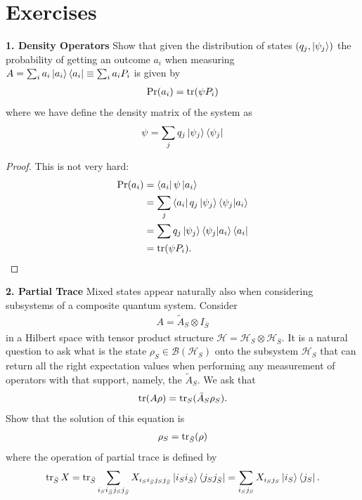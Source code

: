 \documentclass{book}
\theoremstyle{definition}
\newcommand{\nn}{\nonumber}
\newcommand{\had}{\mathcal{H}}
\begin{document}
\newpage


\section{Exercises}

\noindent \textbf{1. Density Operators} Show that given the distribution of states $(q_j, \ket{\psi_j})$ the probability of getting an outcome $a_i$ when measuring $A = \sum_i a_i \ket{a_i}\bra{a_i} \equiv \sum_i a_i P_i$ is given by
\begin{align}
\Pr(a_i) = \tr(\psi P_i)
\end{align} 
where we have define the density matrix of the system as
\begin{align}
\psi = \sum_j q_j \ket{\psi_j}\bra{\psi_j}
\end{align}


\begin{proof}
	This is not very hard: 
	\begin{align}
	\Pr(a_i) &= \bra{a_i} \psi \ket{a_i}\nn\\
	&= \sum_j \bra{a_i} q_j \ket{\psi_j}\bra{\psi_j}\ket{a_i}\nn\\
	&= \sum q_j \ket{\psi_j}\bra{\psi_j}\ket{a_i}\bra{a_i}\nn\\
	&= \tr(\psi P_i).
	\end{align}
\end{proof}




\noindent \textbf{2. Partial Trace} Mixed states appear naturally also when considering subsystems of a composite
quantum system. Consider
\begin{align}
A = \tilde{A}_S \otimes I_{\bar{S}}
\end{align}
in a Hilbert space with tensor product structure $\had = \had_S \otimes \had_{\bar{S}}$. It is a natural question to ask what is the state $\rho_S \in \mathcal{B}(\had_S)$ onto the subsystem $\had_S$ that can return all the right expectation values when performing any measurement of operators with that support, namely, the $\tilde{A}_S$. We ask that 
\begin{align}
\tr(A\rho) = \tr_S(\tilde{A}_S \rho_S).
\end{align}
Show that the solution of this equation is 
\begin{align}
\rho_S = \tr_{\bar{S}}(\rho)
\end{align}
where the operation of partial trace is defined by
\begin{align}
\tr_{\bar{S}}X = \tr_{\bar{S}}\sum_{i_S i_{\bar{S}} j_S j_{\bar{S}}}  X_{i_S i_{\bar{S}} j_S j_{\bar{S}}} \ket{i_S i_{\bar{S}}}\bra{j_S j_{\bar{S}}} = \sum_{i_S  j_S} X_{i_S j_S} \ket{i_S}\bra{j_S}.
\end{align}
\end{document}

